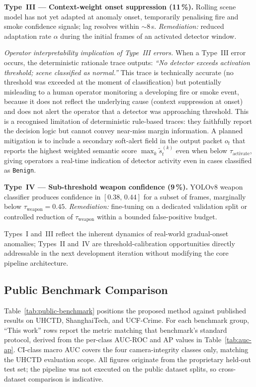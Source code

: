\documentclass[sensors,article,submit,pdftex,moreauthors]{Definitions/mdpi}
\begin{document}
\textbf{Type~III — Context-weight onset suppression (11\,\%).}
Rolling scene model has not yet adapted at anomaly onset, temporarily
penalising fire and smoke confidence signals; lag resolves within $\sim$8\,s.
\textit{Remediation:} reduced adaptation rate $\alpha$ during the initial
frames of an activated detector window.
 
\textit{Operator interpretability implication of Type~III errors.} When a Type~III error occurs, the deterministic rationale trace outputs: \textit{``No detector exceeds activation threshold; scene classified as normal.''} This trace is technically accurate (no threshold was exceeded at the moment of classification) but potentially misleading to a human operator monitoring a developing fire or smoke event, because it does not reflect the underlying cause (context suppression at onset) and does not alert the operator that a detector was approaching threshold. This is a recognised limitation of deterministic rule-based traces: they faithfully report the decision logic but cannot convey near-miss margin information. A planned mitigation is to include a secondary soft-alert field in the output packet $o_t$ that reports the highest weighted semantic score $\max_k \tilde{s}_t^{(k)}$ even when below $\tau_{\text{activate}}$, giving operators a real-time indication of detector activity even in cases classified as \texttt{Benign}.
 
\textbf{Type~IV — Sub-threshold weapon confidence (9\,\%).}
YOLOv8 weapon classifier produces confidence in $[0.38,\,0.44]$ for a subset
of frames, marginally below $\tau_{\text{weapon}} = 0.45$.
\textit{Remediation:} fine-tuning on a dedicated validation split or
controlled reduction of $\tau_{\text{weapon}}$ within a bounded
false-positive budget.
 
Types~I and~III reflect the inherent dynamics of real-world gradual-onset
anomalies; Types~II and~IV are threshold-calibration opportunities directly
addressable in the next development iteration without modifying the core
pipeline architecture.
 
\subsection{Public Benchmark Comparison}
\label{sec:revision-experiments}
 
Table~\ref{tab:public-benchmark} positions the proposed method against published results on UHCTD, ShanghaiTech, and UCF-Crime. For each benchmark group, ``This work'' rows report the metric matching that benchmark's standard protocol, derived from the per-class AUC-ROC and AP values in Table~\ref{tab:auc-ap}. CI-class macro AUC covers the four camera-integrity classes only, matching the UHCTD evaluation scope. All figures originate from the proprietary held-out test set; the pipeline was not executed on the public dataset splits, so cross-dataset comparison is indicative.
 
\end{document}
